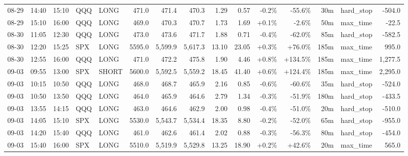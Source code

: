 \documentclass[11pt,a4paper,twoside]{article}
\begin{document}
\begin{landscape}
\begin{center}
\begin{longtable}{>{\color{txtmain}}l l l l l r r r r r r r r >{\color{txtmain}}l r}
08-29 & 14:40 & 15:10 & QQQ & LONG & 471.0 & 471.4 & 470.3 & 1.29 & 0.57 & \textcolor{lossred}{-0.2\%} & \textcolor{lossred}{-55.6\%} & 30m & hard\_stop & \textcolor{lossred}{-504.0} \\
08-29 & 15:10 & 16:00 & QQQ & LONG & 469.0 & 470.3 & 470.7 & 1.73 & 1.69 & \textcolor{wingreen}{+0.1\%} & \textcolor{lossred}{-2.6\%} & 50m & max\_time & \textcolor{lossred}{-22.5} \\
08-30 & 11:05 & 12:30 & QQQ & LONG & 473.0 & 473.6 & 471.7 & 1.88 & 0.71 & \textcolor{lossred}{-0.4\%} & \textcolor{lossred}{-62.0\%} & 85m & hard\_stop & \textcolor{lossred}{-582.5} \\
08-30 & 12:20 & 15:25 & SPX & LONG & 5595.0 & 5,599.9 & 5,617.3 & 13.10 & 23.05 & \textcolor{wingreen}{+0.3\%} & \textcolor{wingreen}{+76.0\%} & 185m & max\_time & \textcolor{wingreen}{995.0} \\
08-30 & 12:55 & 16:00 & QQQ & LONG & 471.0 & 472.2 & 475.8 & 1.90 & 4.46 & \textcolor{wingreen}{+0.8\%} & \textcolor{wingreen}{+134.5\%} & 185m & max\_time & \textcolor{wingreen}{1,277.5} \\
09-03 & 09:55 & 13:00 & SPX & SHORT & 5600.0 & 5,592.5 & 5,559.2 & 18.45 & 41.40 & \textcolor{wingreen}{+0.6\%} & \textcolor{wingreen}{+124.4\%} & 185m & max\_time & \textcolor{wingreen}{2,295.0} \\
09-03 & 10:15 & 10:50 & QQQ & LONG & 468.0 & 468.7 & 465.9 & 2.16 & 0.85 & \textcolor{lossred}{-0.6\%} & \textcolor{lossred}{-60.6\%} & 35m & hard\_stop & \textcolor{lossred}{-524.0} \\
09-03 & 10:50 & 13:50 & QQQ & LONG & 464.0 & 465.9 & 464.6 & 2.79 & 1.34 & \textcolor{lossred}{-0.3\%} & \textcolor{lossred}{-51.9\%} & 180m & hard\_stop & \textcolor{lossred}{-433.5} \\
09-03 & 13:55 & 14:15 & QQQ & LONG & 463.0 & 464.6 & 462.9 & 2.00 & 0.98 & \textcolor{lossred}{-0.4\%} & \textcolor{lossred}{-51.0\%} & 20m & hard\_stop & \textcolor{lossred}{-510.0} \\
09-03 & 14:05 & 15:10 & SPX & LONG & 5530.0 & 5,543.7 & 5,534.4 & 18.35 & 8.80 & \textcolor{lossred}{-0.2\%} & \textcolor{lossred}{-52.0\%} & 65m & hard\_stop & \textcolor{lossred}{-955.0} \\
09-03 & 14:20 & 15:40 & QQQ & LONG & 461.0 & 462.6 & 461.4 & 2.02 & 0.88 & \textcolor{lossred}{-0.3\%} & \textcolor{lossred}{-56.3\%} & 80m & hard\_stop & \textcolor{lossred}{-454.0} \\
09-03 & 15:40 & 16:00 & SPX & LONG & 5510.0 & 5,519.9 & 5,529.8 & 13.25 & 18.90 & \textcolor{wingreen}{+0.2\%} & \textcolor{wingreen}{+42.6\%} & 20m & max\_time & \textcolor{wingreen}{565.0} \\

\end{longtable}
\end{center}
\end{landscape}
\end{document}
